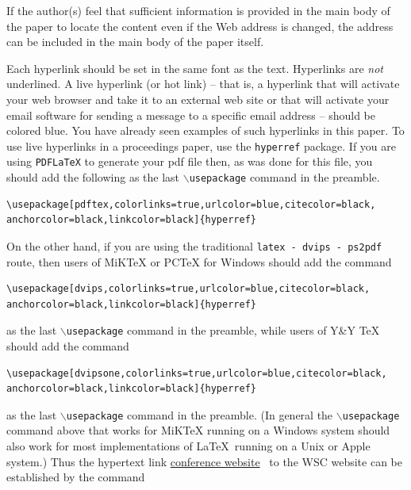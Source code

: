 \documentclass{wscpaperproc}
\theoremstyle{wsc}
\begin{document}
If the author(s) feel that sufficient information is provided in the main body of the paper to locate the content even if the Web address is changed, the address can be included in the main body of the paper itself.

Each hyperlink should be set in the same font as the text.
Hyperlinks are {\em not} underlined.
A live hyperlink (or hot link) -- that is, a hyperlink that will activate your web browser and take it to an external web site or that will activate your email software for sending a message to a specific email address -- should be colored blue. You have already seen examples of such hyperlinks in this paper.
To use live hyperlinks in a proceedings paper, use the {\tt hyperref} package. If you are using {\tt PDFLaTeX} to generate your pdf file then, as
was done for this file, you should add the following as the last {\tt $\backslash$usepackage} command in the preamble.\newline


\begin{verbatim}
\usepackage[pdftex,colorlinks=true,urlcolor=blue,citecolor=black,
anchorcolor=black,linkcolor=black]{hyperref}
\end{verbatim}\vspace{5 mm}

\noindent On the other hand, if you are using the traditional {\tt latex - dvips - ps2pdf} route, then users of MiKTeX or PCTeX for Windows should add the command\newline


\begin{verbatim}
\usepackage[dvips,colorlinks=true,urlcolor=blue,citecolor=black,
anchorcolor=black,linkcolor=black]{hyperref}
\end{verbatim}\vspace{5 mm}


\noindent as the last {\tt $\backslash$usepackage} command in the preamble, while users of Y\&Y TeX should add the command\newline


\begin{verbatim}
\usepackage[dvipsone,colorlinks=true,urlcolor=blue,citecolor=black,
anchorcolor=black,linkcolor=black]{hyperref}
\end{verbatim}\vspace{5 mm}


\noindent as the last {\tt $\backslash$usepackage} command in the preamble.
(In general the {\tt $\backslash$usepackage} command above that works for MiKTeX running on a Windows system should also work for most implementations of \LaTeX\ running on a Unix or Apple system.)
Thus the hypertext link \href{http://www.wintersim.org}{conference website}~\cite{WSC} to the WSC website can be established by the command\newline
\end{document}
